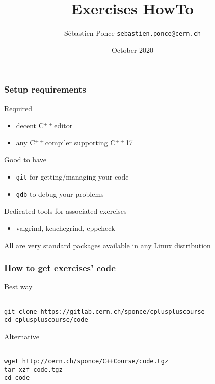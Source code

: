 \documentclass[compress]{beamer}
\title{Exercises HowTo}
\author[S. Ponce]{S\'ebastien Ponce  \texttt{sebastien.ponce@cern.ch}}
\institute{CERN}
\date{October 2020}
\newcommand{\cpp}{C$^{++}$}
\begin{document}
\begin{frame}
  \titlepage
\end{frame}

\begin{frame}
  \frametitle{Setup requirements}
  \begin{exampleblock}{Required}
    \begin{itemize}
    \item decent \cpp editor
    \item any \cpp compiler supporting \cpp17
    \end{itemize}
  \end{exampleblock}
  \begin{alertblock}{Good to have}
    \begin{itemize}
    \item \texttt{git} for getting/managing your code
    \item \texttt{gdb} to debug your problems
    \end{itemize}
  \end{alertblock}
  \begin{block}{Dedicated tools for associated exercises}
    \begin{itemize}
    \item valgrind, kcachegrind, cppcheck
    \end{itemize}
  \end{block}
  All are very standard packages available in any Linux distribution
\end{frame}

\begin{frame}[fragile]
  \frametitle{How to get exercises' code}
  \begin{exampleblock}{Best way}
    \begin{verbatim}
  
git clone https://gitlab.cern.ch/sponce/cpluspluscourse
cd cpluspluscourse/code
    \end{verbatim}
  \end{exampleblock}
  \begin{alertblock}{Alternative}
    \begin{verbatim}
  
wget http://cern.ch/sponce/C++Course/code.tgz
tar xzf code.tgz
cd code
    \end{verbatim}    
  \end{alertblock}
\end{frame}
\end{document}
